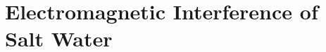 \section{Electromagnetic Interference of Salt Water}

%
%
%
%
%
%
%
%
%
%
%
%
%
%
%
%
%
%
%
%
%
%
%
%
%

